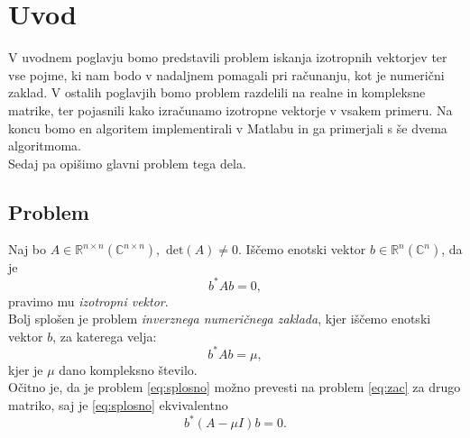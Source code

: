 \documentclass[12pt,a4paper]{amsart}
\theoremstyle{definition}
\theoremstyle{plain}
\newcommand{\R}{\mathbb R}
\newcommand{\C}{\mathbb C}
\begin{document}

\section{Uvod}
V uvodnem poglavju bomo predstavili problem iskanja izotropnih vektorjev ter vse pojme, ki nam bodo v nadaljnem pomagali pri računanju, kot je numerični zaklad. 
V ostalih poglavjih bomo problem razdelili na realne in kompleksne matrike, ter pojasnili kako izračunamo izotropne vektorje v vsakem primeru.
Na koncu bomo en algoritem implementirali v Matlabu in ga primerjali s še dvema algoritmoma.\\
Sedaj pa opišimo glavni problem tega dela.
\subsection{Problem}

Naj bo $A\in\R^{n\times n} (\C^{n\times n}),$ $\text{det}(A)\ne 0$. Iščemo enotski vektor $b\in\R^{n} (\C^{n})$, da je
\begin{equation}\label{eq:zac}
b^\ast Ab=0,
\end{equation}
pravimo mu \emph{izotropni vektor}. \\
Bolj splošen je problem \emph{inverznega numeričnega zaklada}, kjer iščemo enotski vektor $b$, za katerega velja:
\begin{equation}\label{eq:splosno}
b^\ast Ab=\mu,
\end{equation}
kjer je $\mu$ dano kompleksno število.\\
Očitno je, da je problem \eqref{eq:splosno} možno prevesti na problem \eqref{eq:zac} za drugo matriko, saj je \eqref{eq:splosno} ekvivalentno
$$b^\ast (A-\mu I)b=0.$$
\end{document}
